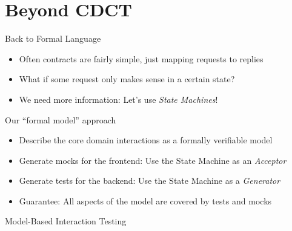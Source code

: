 \part{Beyond CDCT}

\begin{frame}[fragile]{Back to Formal Language}
  \begin{itemize}[<+->]
  \item Often contracts are fairly simple, just mapping requests to replies
  \item What if some request only makes sense in a certain state?
  \item We need more information: Let's use \emph{State Machines}!
  \end{itemize}
\end{frame}


\begin{frame}[fragile]{Our ``formal model'' approach}

  \begin{itemize}[<+->]
  \item Describe the core domain interactions as a formally verifiable model
  \item Generate mocks for the frontend: Use the State Machine as an \emph{Acceptor}
  \item Generate tests for the backend: Use the State Machine as a \emph{Generator}
  \item Guarantee: All aspects of  the model are covered by tests and mocks
  \end{itemize}

\end{frame}

\begin{frame}[fragile]{Model-Based Interaction Testing}
\end{frame}



